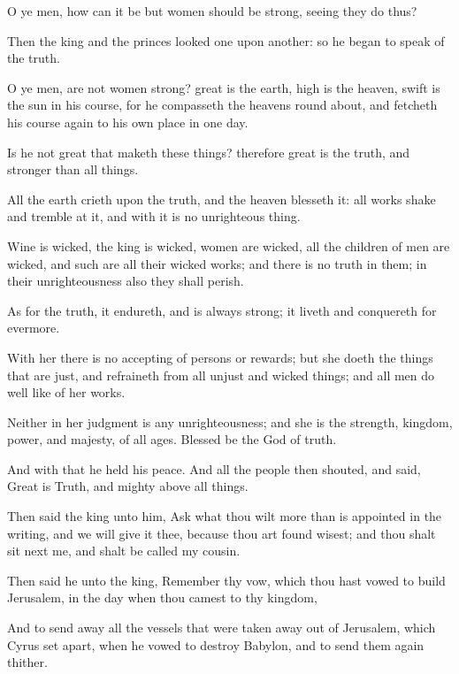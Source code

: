 {\par }{\PP {}O ye men, how can it be but women should be strong, seeing they do thus?
\par }{\PP {}Then the king and the princes looked one upon another: so he began to speak of the truth.
\par }{\PP {}O ye men, are not women strong? great is the earth, high is the heaven, swift is the sun in his course, for he compasseth the heavens round about, and fetcheth his course again to his own place in one day.
\par }{\PP {}Is he not great that maketh these things? therefore great is the truth, and stronger than all things.
\par }{\PP {}All the earth crieth upon the truth, and the heaven blesseth it: all works shake and tremble at it, and with it is no unrighteous thing.
\par }{\PP {}Wine is wicked, the king is wicked, women are wicked, all the children of men are wicked, and such are all their wicked works; and there is no truth in them; in their unrighteousness also they shall perish.
\par }{\PP {}As for the truth, it endureth, and is always strong; it liveth and conquereth for evermore.
\par }{\PP {}With her there is no accepting of persons or rewards; but she doeth the things that are just, and refraineth from all unjust and wicked things; and all men do well like of her works.
\par }{\PP {}Neither in her judgment is any unrighteousness; and she is the strength, kingdom, power, and majesty, of all ages. Blessed be the God of truth.
\par }{\PP {}And with that he held his peace. And all the people then shouted, and said, Great is Truth, and mighty above all things.
\par }{\PP {}Then said the king unto him, Ask what thou wilt more than is appointed in the writing, and we will give it thee, because thou art found wisest; and thou shalt sit next me, and shalt be called my cousin.
\par }{\PP {}Then said he unto the king, Remember thy vow, which thou hast vowed to build Jerusalem, in the day when thou camest to thy kingdom,
\par }{\PP {}And to send away all the vessels that were taken away out of Jerusalem, which Cyrus set apart, when he vowed to destroy Babylon, and to send them again thither.
}
